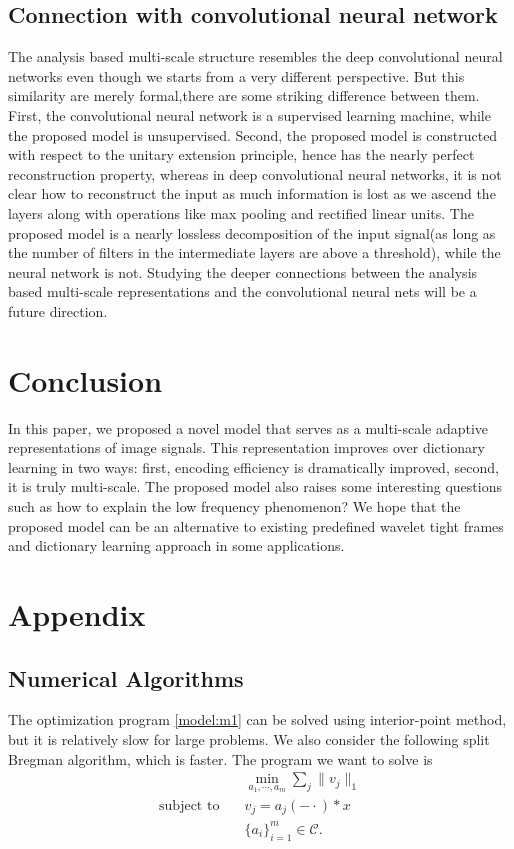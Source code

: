 \documentclass[a4paper]{article}
\begin{document}
\subsection{Connection with convolutional neural network}
The analysis based multi-scale structure resembles the deep convolutional neural networks even though we starts from a very different perspective. But this similarity are merely formal,there are some striking difference between them. First, the convolutional neural network is a supervised learning machine, while the proposed model is unsupervised. Second, the proposed model is constructed with respect to the unitary extension principle, hence has the nearly perfect reconstruction property, whereas in deep convolutional neural networks, it is not clear how to reconstruct the input as much information is lost as we ascend the layers along with operations like max pooling and rectified linear units. The proposed model is a nearly lossless decomposition of the input signal(as long as the number of filters in the intermediate layers are above a threshold), while the neural network is not. Studying the deeper connections between the analysis based multi-scale representations and the convolutional neural nets will be a future direction.

\section{Conclusion}
In this paper, we proposed a novel model that serves as a multi-scale adaptive representations of image signals. This representation improves over dictionary learning in two ways: first, encoding efficiency is dramatically improved, second, it is truly multi-scale. The proposed model also raises some interesting questions such as how to explain the low frequency phenomenon? We hope that the proposed model can be an alternative to existing predefined wavelet tight frames and dictionary learning approach in some applications.
\section{Appendix}
\subsection{Numerical Algorithms}

The optimization program \eqref{model:m1} can be solved using interior-point method, but it is relatively slow for large problems. We also consider the following split Bregman algorithm, which is faster. The program we want to solve is 
\begin{equation}
\begin{aligned}
&\min_{a_1,\cdots,a_m} \sum_j \|v_j\|_1 \\
\textrm{subject to} \quad & v_j = a_j(-\cdot)*x \\
	& \{a_i\}_{i=1}^m \in \mathcal{C}.
	\end{aligned}
\end{equation}
\end{document}

